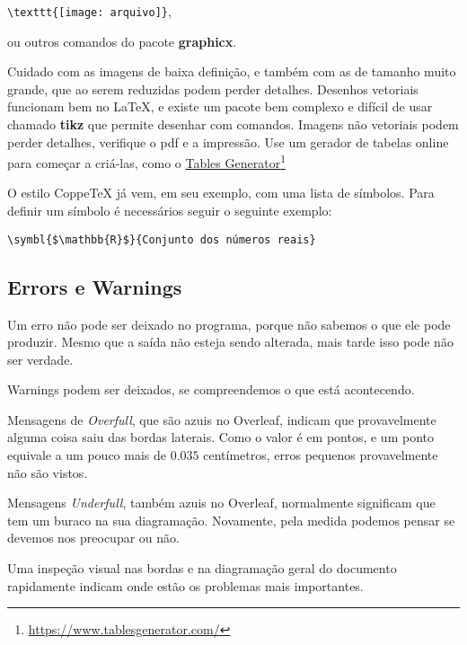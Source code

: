 \documentclass{article}
\begin{document}
\begin{outline}
 \verb!\texttt{[image: arquivo]}!, 
 
 ou outros comandos do pacote \textbf{graphicx}.

\2 Cuidado com as imagens de baixa definição, e também com as de tamanho muito grande, que ao serem reduzidas podem perder detalhes. 
\2 Desenhos vetoriais funcionam bem no \LaTeX, e existe um pacote bem complexo e difícil de usar chamado \textbf{tikz} que permite desenhar com comandos. 
\3 Imagens não vetoriais podem perder detalhes, verifique o pdf e a impressão.
\2 Use um gerador de tabelas online para começar a criá-las, como o \href{https://www.tablesgenerator.com/}{Tables Generator}\footnote{\url{https://www.tablesgenerator.com/}}
\end{outline}

O estilo CoppeTeX já vem, em seu exemplo, com uma lista de símbolos. Para definir um símbolo é necessários seguir o seguinte exemplo:

\begin{verbatim}
\symbl{$\mathbb{R}$}{Conjunto dos números reais}
\end{verbatim}


\subsection{Errors e Warnings}

Um erro não pode ser deixado no programa, porque não sabemos o que ele pode produzir. Mesmo que a saída não esteja sendo alterada, mais tarde isso pode não ser verdade.

Warnings podem ser deixados, se compreendemos o que está acontecendo.

Mensagens de \textit{Overfull}, que são azuis no Overleaf, indicam que provavelmente alguma coisa saiu das bordas laterais. Como o valor é em pontos, e um ponto equivale a um pouco mais de  $0.035$ centímetros, erros pequenos provavelmente não são vistos.

Mensagens \textit{Underfull}, também azuis no Overleaf, normalmente significam que tem um buraco na sua diagramação. Novamente, pela medida podemos pensar se devemos nos preocupar ou não.

Uma inspeção visual nas bordas e na diagramação geral do documento rapidamente indicam onde estão os problemas mais importantes.
\end{document}
